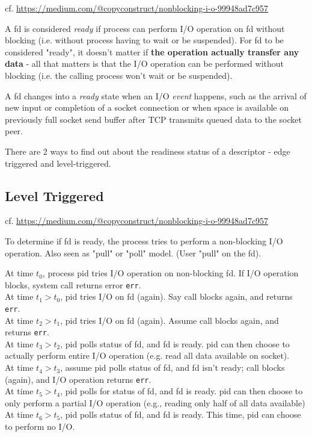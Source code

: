 \documentclass[10pt]{amsart}
\begin{document}
cf. \url{https://medium.com/@copyconstruct/nonblocking-i-o-99948ad7c957}

A fd is considered \emph{ready} if process can perform I/O operation on fd without blocking (i.e. without process having to wait or be suspended). For fd to be considered "ready", it doesn't matter if \textbf{the operation actually transfer any data} - all that matters is that the I/O operation can be performed without blocking (i.e. the calling process won't wait or be suspended).

A fd changes into a \emph{ready} state when an I/O \emph{event} happens, such as the arrival of new input or completion of a socket connection or when space is available on previously full socket send buffer after TCP transmits queued data to the socket peer.

There are 2 ways to find out about the readiness status of a descriptor - edge triggered and level-triggered.

\subsection{Level Triggered}

cf. \url{https://medium.com/@copyconstruct/nonblocking-i-o-99948ad7c957}

To determine if fd is ready, the process tries to perform a non-blocking I/O operation. Also seen as "pull" or "poll" model. (User "pull" on the fd).

At time $t_0$, process pid tries I/O operation on non-blocking fd. If I/O operation blocks, system call returns error \texttt{err}. \\
At time $t_1 > t_0$, pid tries I/O on fd (again). Say call blocks again, and returns \texttt{err}. \\
At time $t_2 > t_1$, pid tries I/O on fd (again). Assume call blocks again, and returns \texttt{err}. \\
At time $t_3 > t_2$, pid polls status of fd, and fd is ready. pid can then choose to actually perform entire I/O operation (e.g. read all data available on socket). \\
At time $t_4 > t_3$, assume pid polls status of fd, and fd isn't ready; call blocks (again), and I/O operation returns \texttt{err}. \\
At time $t_5 > t_4$, pid polls for status of fd, and fd is ready. pid can then choose to only perform a partial I/O operation (e.g., reading only half of all data available) \\
At time $t_6 > t_5$, pid polls status of fd, and fd is ready. This time, pid can choose to perform no I/O.
\end{document}
